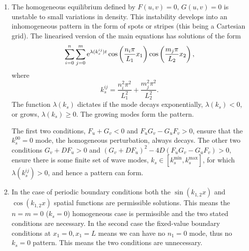 \documentclass[a4paper, 12pt]{article}
\begin{document}
\begin{enumerate}[label={\bf \arabic{*}.\;}, ref={\arabic{*}},itemsep=3ex, left=0ex]
{\begin{enumerate}[label=(\alph*)]
        \end{enumerate}
      }
      {
        \begin{enumerate}[label=(\alph*)]
          \item
            The homogeneous equilibrium defined by $F(u,v) =0,\,G(u,v) = 0$ is unstable to small variations in density. This instability develops into an inhomogeneous pattern in the form of spots or stripes (this being a Cartesian grid). The linearised version of the main equations has solutions of the form
            \begin{equation}
              \sum_{i=0}^{n}\sum_{j=0}^{m}\mathrm{e}^{\lambda(k_s^{ij}) t}\cos\left(\frac{n_i\pi}{L_1}x_1\right)\cos\left(\frac{m_j\pi}{L_2}x_2\right),
            \end{equation}
            where
            \begin{equation}
              k_s^{ij} = \frac{n_i^2\pi^2}{L_1^2}+\frac{m_j^2\pi^2}{L_2^2}.
            \end{equation}
            The function $\lambda(k_s)$ dictates if the mode decays exponentially, $\lambda(k_s)<0$, or grows, $\lambda(k_s)\geq 0$. The growing modes form the pattern.

            The first two conditions, $F_u +G_v <0$ and $F_uG_v  -G_uF_v> 0$, ensure that the $k_s^{00}=0$ mode, the homogeneous perturbation, always decays. The other two conditions $G_v + DF_u>0$ and $(G_v+ D F_u)^2 - 4 D (F_uG_v  -G_uF_v)>0$, ensure there is some finite set of wave modes, $k_s\in[k_s^{\min},k_s^{\max}]$, for which $\lambda(k_s^{ij})>0$, and hence a pattern can form.

          \item
            In the case of periodic boundary conditions both the $\sin(k_{1,2}x)$ and $\cos(k_{1,2}x)$ spatial functions are permissible solutions. This means the $n=m=0$ ($k_s=0$) homogeneous case is permissible and the two stated conditions are necessary. In the second case the fixed-value boundary conditions at $x_1=0,x_1=L$ means we can have no $n_1=0$ mode, thus no $k_s=0$ pattern.  This means the two conditions are unnecessary.

        \end{enumerate}

      }



\end{enumerate}
\end{document}
